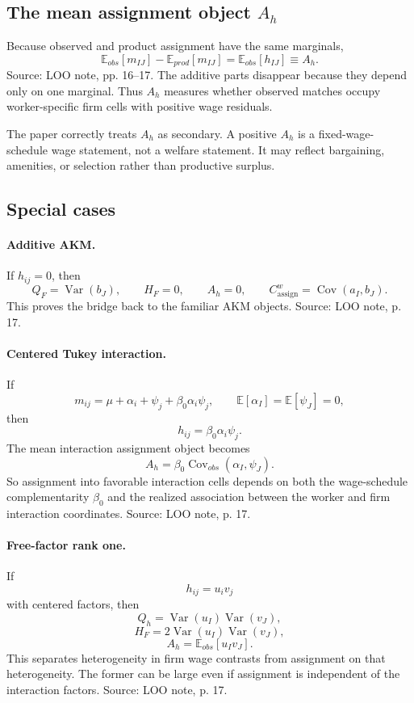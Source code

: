 \documentclass[11pt]{article}
\newcommand{\E}{\mathbb{E}}
\newcommand{\Var}{\operatorname{Var}}
\newcommand{\Cov}{\operatorname{Cov}}
\begin{document}
\subsection{The mean assignment object \(A_h\)}

Because observed and product assignment have the same marginals,
\[
\E_{obs}[m_{IJ}]-\E_{prod}[m_{IJ}]
=
\E_{obs}[h_{IJ}]
\equiv A_h.
\]
Source: LOO note, pp. 16--17. The additive parts disappear because they depend
only on one marginal. Thus \(A_h\) measures whether observed matches occupy
worker-specific firm cells with positive wage residuals.

The paper correctly treats \(A_h\) as secondary. A positive \(A_h\) is a
fixed-wage-schedule wage statement, not a welfare statement. It may reflect
bargaining, amenities, or selection rather than productive surplus.

\subsection{Special cases}

\paragraph{Additive AKM.}
If \(h_{ij}=0\), then
\[
Q_F=\Var(b_J),\qquad H_F=0,\qquad A_h=0,\qquad
C^w_{\mathrm{assign}}=\Cov(a_I,b_J).
\]
This proves the bridge back to the familiar AKM objects. Source: LOO note,
p. 17.

\paragraph{Centered Tukey interaction.}
If
\[
m_{ij}=\mu+\alpha_i+\psi_j+\beta_0\alpha_i\psi_j,
\qquad
\E[\alpha_I]=\E[\psi_J]=0,
\]
then
\[
h_{ij}=\beta_0\alpha_i\psi_j.
\]
The mean interaction assignment object becomes
\[
A_h=\beta_0\Cov_{obs}(\alpha_I,\psi_J).
\]
So assignment into favorable interaction cells depends on both the wage-schedule
complementarity \(\beta_0\) and the realized association between the worker and
firm interaction coordinates. Source: LOO note, p. 17.

\paragraph{Free-factor rank one.}
If
\[
h_{ij}=u_i v_j
\]
with centered factors, then
\[
Q_h=\Var(u_I)\Var(v_J),
\]
\[
H_F=2\Var(u_I)\Var(v_J),
\]
\[
A_h=\E_{obs}[u_I v_J].
\]
This separates heterogeneity in firm wage contrasts from assignment on that
heterogeneity. The former can be large even if assignment is independent of the
interaction factors. Source: LOO note, p. 17.
\end{document}
